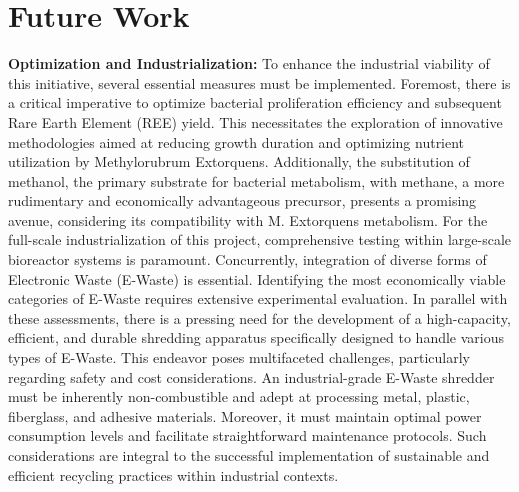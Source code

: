 \chapter{Future Work\authorB{}}

\textbf{Optimization and Industrialization:}
To enhance the industrial viability of this initiative, several essential measures must be implemented.
Foremost, there is a critical imperative to optimize bacterial proliferation efficiency and subsequent
Rare Earth Element (REE) yield. This necessitates the exploration of innovative methodologies aimed
at reducing growth duration and optimizing nutrient utilization by Methylorubrum Extorquens.
Additionally, the substitution of methanol, the primary substrate for bacterial metabolism, with
methane, a more rudimentary and economically advantageous precursor, presents a promising
avenue, considering its compatibility with M. Extorquens metabolism.
For the full-scale industrialization of this project, comprehensive testing within large-scale bioreactor
systems is paramount. Concurrently, integration of diverse forms of Electronic Waste (E-Waste) is
essential. Identifying the most economically viable categories of E-Waste requires extensive
experimental evaluation. In parallel with these assessments, there is a pressing need for the
development of a high-capacity, efficient, and durable shredding apparatus specifically designed to
handle various types of E-Waste.
This endeavor poses multifaceted challenges, particularly regarding safety and cost considerations.
An industrial-grade E-Waste shredder must be inherently non-combustible and adept at processing
metal, plastic, fiberglass, and adhesive materials. Moreover, it must maintain optimal power
consumption levels and facilitate straightforward maintenance protocols. Such considerations are
integral to the successful implementation of sustainable and efficient recycling practices within
industrial contexts.

